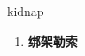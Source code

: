 
\begin{frame}
{\huge kidnap}
\begin{center}
\begin{enumerate}\Large
  \item \textbf{绑架勒索}
\end{enumerate}
\end{center}
\end{frame}
